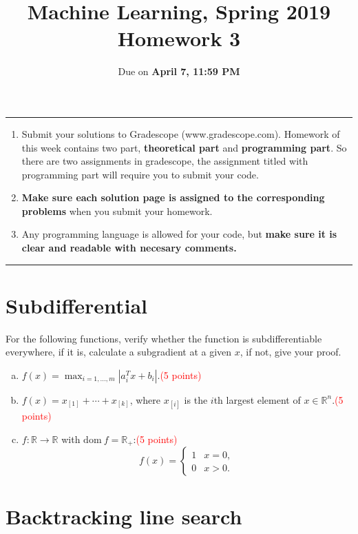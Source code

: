\documentclass[11pt, a4paper]{article}
\begin{document}
\title{\textbf{Machine Learning, Spring 2019}\\Homework 3}
\date{Due on \textbf{April 7, 11:59 PM}}
\author{}
\maketitle

  \noindent
\rule{\linewidth}{0.4pt}
\begin{enumerate}
    \item Submit your solutions to Gradescope (www.gradescope.com).
    Homework of this week contains two part, \textbf{theoretical part} and \textbf{programming part}. So there are two assignments in gradescope, the assignment titled with programming part will require you to submit your code.
    \item \textbf{Make sure each solution page is assigned to the corresponding problems }when you submit your homework. 
    \item 
    Any programming language is allowed for your code, but \textbf{make sure it is clear and readable with necesary comments.}
\end{enumerate}

  \noindent
\rule{\linewidth}{0.4pt}

\section{Subdifferential}
For the following functions, verify whether the function is subdifferentiable everywhere, if it is, calculate a subgradient at a given $x$, if not, give your proof.
\begin{enumerate}[(a)]
\item $f(x) = \max_{i=1,...,m} |a_i^Tx + b_i|$.\textcolor{red}{(5 points)}

\item $f(x) = x_{[1]} + \cdots + x_{[k]}$, where $x_{[i]}$ is the $i$th largest element of $x \in \mathbb{R}^n$.\textcolor{red}{(5 points)}

\item $f:\mathbb{R} \to \mathbb{R}$ with $\text{dom} \ f = \mathbb{R}_+$:\textcolor{red}{(5 points)}
\[ f(x) = \begin{cases}  1 & x=0,\\
0 & x>0.
\end{cases}
\] 
\end{enumerate}

\section{Backtracking line search}
\end{document}

